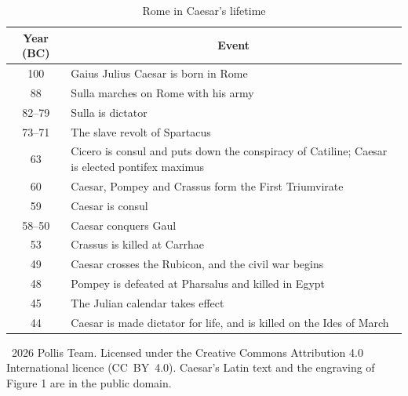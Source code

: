 \documentclass[11pt]{article}
\renewcommand{\tablename}{Tabula}
\begin{document}
\renewcommand{\tablename}{Table}
\begin{table}[H]
\centering
\caption{Rome in Caesar's lifetime}
\begin{tabular}{cp{11cm}}
\toprule
Year (BC) & \multicolumn{1}{c}{Event} \\
\midrule
100 & Gaius Julius Caesar is born in Rome \\
88 & Sulla marches on Rome with his army \\
82--79 & Sulla is dictator \\
73--71 & The slave revolt of Spartacus \\
63 & Cicero is consul and puts down the conspiracy of Catiline; Caesar is elected pontifex maximus \\
60 & Caesar, Pompey and Crassus form the First Triumvirate \\
59 & Caesar is consul \\
58--50 & Caesar conquers Gaul \\
53 & Crassus is killed at Carrhae \\
49 & Caesar crosses the Rubicon, and the civil war begins \\
48 & Pompey is defeated at Pharsalus and killed in Egypt \\
45 & The Julian calendar takes effect \\
44 & Caesar is made dictator for life, and is killed on the Ides of March \\
\bottomrule
\end{tabular}
\end{table}

\vfill
{\footnotesize \textcopyright\ 2026 Pollis Team. Licensed under the Creative Commons Attribution 4.0 International licence (CC~BY~4.0). Caesar's Latin text and the engraving of Figure 1 are in the public domain.\par}
\end{document}
